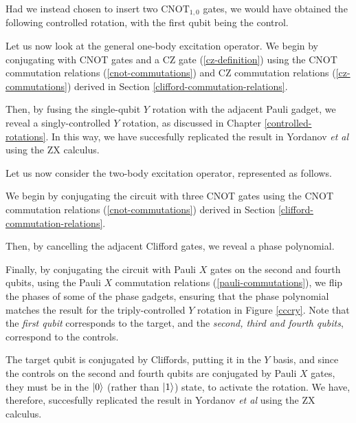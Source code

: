 Had we instead chosen to insert two $\text{CNOT}_{1, 0}$ gates, we would have obtained the following controlled rotation, with the first qubit being the control.


Let us now look at the general one-body excitation operator. We begin by conjugating with CNOT gates and a CZ gate (\ref{cz-definition}) using the CNOT commutation relations (\ref{cnot-commutations}) and CZ commutation relations (\ref{cz-commutations}) derived in Section \ref{clifford-commutation-relations}.


Then, by fusing the single-qubit $Y$ rotation with the adjacent Pauli gadget, we reveal a singly-controlled $Y$ rotation, as discussed in Chapter \ref{controlled-rotations}. In this way, we have succesfully replicated the result in Yordanov \textit{et al} \cite{Yordanov2020} using the ZX calculus.


Let us now consider the two-body excitation operator, represented as follows.


We begin by conjugating the circuit with three CNOT gates using the CNOT commutation relations (\ref{cnot-commutations}) derived in Section \ref{clifford-commutation-relations}.


Then, by cancelling the adjacent Clifford gates, we reveal a phase polynomial.


Finally, by conjugating the circuit with Pauli $X$ gates on the second and fourth qubits, using the Pauli $X$ commutation relations (\ref{pauli-commutations}), we flip the phases of some of the phase gadgets, ensuring that the phase polynomial matches the result for the triply-controlled $Y$ rotation in Figure \ref{cccry}. Note that the \textit{first qubit} corresponds to the target, and the \textit{second, third and fourth qubits}, correspond to the controls.


The target qubit is conjugated by Cliffords, putting it in the $Y$ basis, and since the controls on the second and fourth qubits are conjugated by Pauli $X$ gates, they must be in the $\ket 0$ (rather than $\ket 1$) state, to activate the rotation. We have, therefore, succesfully replicated the result in Yordanov \textit{et al} \cite{Yordanov2020} using the ZX calculus.


